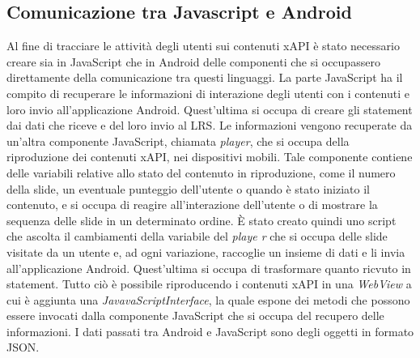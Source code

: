 \documentclass[../Tesi.tex]{subfiles}
\begin{document}
	\subsection{Comunicazione tra Javascript e Android}
	Al fine di tracciare le attività degli utenti sui contenuti xAPI è stato necessario creare sia in JavaScript che in Android delle componenti che si occupassero direttamente della comunicazione tra questi linguaggi. La parte JavaScript ha il compito di recuperare le informazioni di interazione degli utenti con i contenuti e loro invio all'applicazione Android. Quest'ultima si occupa di creare gli statement dai dati che riceve e del loro invio al LRS. Le informazioni vengono recuperate da un'altra componente JavaScript, chiamata \textit{player}, che si occupa della riproduzione dei contenuti xAPI, nei dispositivi mobili. Tale componente contiene delle variabili relative allo stato del contenuto in riproduzione, come il numero della slide, un eventuale punteggio dell'utente o quando è stato iniziato il contenuto, e si occupa di reagire all'interazione dell'utente o di mostrare la sequenza delle slide in un determinato ordine. 
	È stato creato quindi uno script che ascolta il cambiamenti della variabile del \textit{playe r} che si occupa delle slide visitate da un utente e, ad ogni variazione, raccoglie un insieme di dati e li invia all'applicazione Android. Quest'ultima si occupa di trasformare quanto ricvuto in statement. Tutto ciò è possibile riproducendo i contenuti xAPI in una \textit{WebView} a cui è aggiunta una \textit{JavavaScriptInterface}, la quale espone dei metodi che possono essere invocati dalla componente JavaScript che si occupa del recupero delle informazioni. I dati passati tra Android e JavaScript sono degli oggetti in formato JSON.
\end{document}
